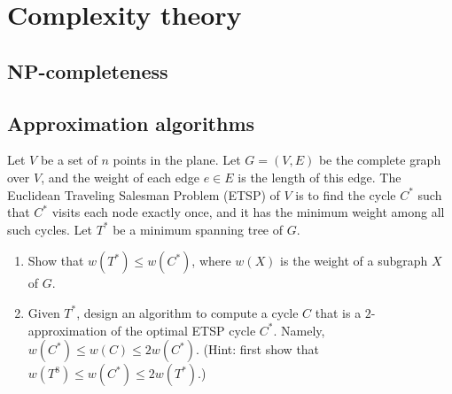 \chapter{Complexity theory}

\section{NP-completeness}


\section{Approximation algorithms}
\begin{Exercise}
Let $V$ be a set of $n$ points in the plane. Let $G = (V, E)$ be the complete graph over $V$, and the weight of each edge $e \in E$ is the length of this edge. The Euclidean Traveling Salesman Problem (ETSP) of $V$ is to find the cycle $C^*$ such that $C^*$ visits each node exactly once, and it has the minimum weight among all such cycles. Let $T^*$ be a minimum spanning tree of $G$.
\begin{enumerate}
\item Show that $w(T^*) \leq w(C^*)$, where $w(X)$ is the weight of a subgraph $X$ of $G$.
\item Given $T^*$, design an algorithm to compute a cycle $C$ that is a $2$-approximation of the optimal ETSP cycle $C^*$. Namely, $w(C^*) \leq w(C) \leq 2w(C^*)$. (Hint: first show that $w(T^8) \leq w(C^*) \leq 2w(T^*)$.)
\end{enumerate}
\end{Exercise}
\begin{Answer}
\end{Answer}

\printbibliography[heading=subbibliography]
